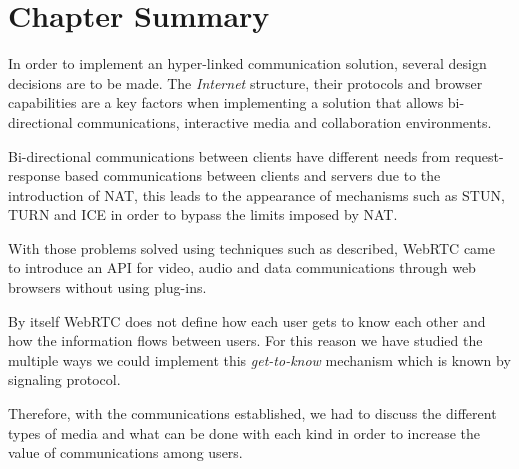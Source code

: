 \section{Chapter Summary}
\label{related:summary}

In order to implement an hyper-linked communication solution, several design decisions are to be made. The \emph{Internet} structure, their protocols and browser capabilities are a key factors when implementing a solution that allows bi-directional communications, interactive media and collaboration environments.

Bi-directional communications between clients have different needs from request-response based communications between clients and servers due to the introduction of \ac{NAT}, this leads to the appearance of mechanisms such as \ac{STUN}, \ac{TURN} and \ac{ICE} in order to bypass the limits imposed by \ac{NAT}.

With those problems solved using techniques such as described, \ac{WebRTC} came to introduce an \ac{API} for video, audio and data communications through web browsers without using plug-ins.

By itself \ac{WebRTC} does not define how each user gets to know each other and how the information flows between users. For this reason we have studied the multiple ways we could implement this \emph{get-to-know} mechanism which is known by signaling protocol.

Therefore, with the communications established, we had to discuss the different types of media and what can be done with each kind in order to increase the value of communications among users.